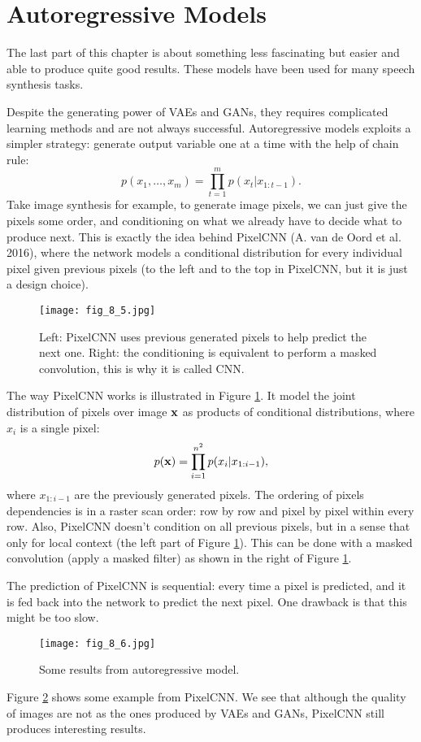 \documentclass[../main.tex]{subfiles}
\begin{document}
\section{Autoregressive Models}
The last part of this chapter is about something less fascinating but easier and able to produce quite good results. These models have been used for many speech synthesis tasks.
\par Despite the generating power of VAEs and GANs, they requires complicated learning methods and are not always successful. Autoregressive models exploits a simpler strategy: generate output variable one at a time with the help of chain rule:
\begin{equation*}
p(x_1,\dots,x_m)=\prod_{t=1}^{m}p(x_t|x_{1:t-1}).
\end{equation*}
Take image synthesis for example, to generate image pixels, we can just give the pixels some order, and conditioning on what we already have to decide what to produce next. This is exactly the idea behind PixelCNN (A. van de Oord et al. 2016), where the network models a conditional distribution for every individual pixel given previous pixels (to the left and to the top in PixelCNN, but it is just a design choice).
\begin{figure}[h] 
	\centering 
	\texttt{[image: fig\_8\_5.jpg]} 
	\caption{Left: PixelCNN uses previous generated pixels to help predict the next one. Right: the conditioning is equivalent to perform a masked convolution, this is why it is called CNN.}\label{fig_8_5}
\end{figure}
The way PixelCNN works is illustrated in Figure \ref{fig_8_5}. It model the joint distribution of pixels over image ${\bf x}$ as products of conditional distributions, where $x_i$ is a single pixel:
\begin{equation*}
p({\bf x})=\prod_{i=1}^{n^2}p(x_i|x_{1:i-1}),
\end{equation*}
where $x_{1:i-1}$ are the previously generated pixels. The ordering of pixels dependencies is in a raster scan order: row by row and pixel by pixel within every row. Also, PixelCNN doesn't condition on all previous pixels, but in a sense that only for local context (the left part of Figure \ref{fig_8_5}). This can be done with a masked convolution (apply a masked filter) as shown in the right of Figure \ref{fig_8_5}.
\par The prediction of PixelCNN is sequential: every time a pixel is predicted, and it is fed back into the network to predict the next pixel. One drawback is that this might be too slow. 
\begin{figure}[h] 
	\centering 
	\texttt{[image: fig\_8\_6.jpg]} 
	\caption{Some results from autoregressive model.}\label{fig_8_6}
\end{figure}
\par Figure \ref{fig_8_6} shows some example from PixelCNN. We see that although the quality of images are not as the ones produced by VAEs and GANs, PixelCNN still produces interesting results.
\end{document}
